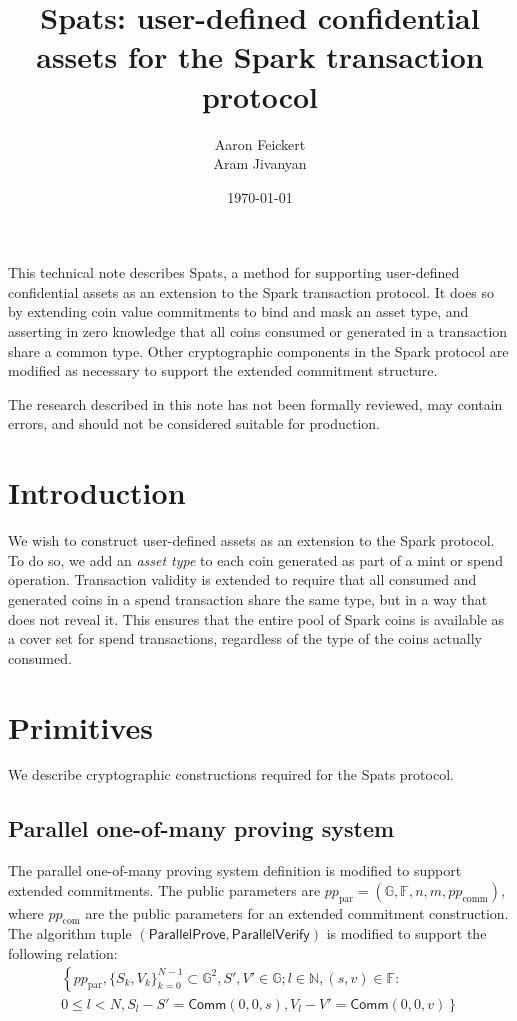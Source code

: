 \documentclass{article}
\title{Spats: user-defined confidential assets for the Spark transaction protocol}
\author{Aaron Feickert \\ Aram Jivanyan}
\date{\today}
\newcommand{\G}{\mathbb{G}}
\newcommand{\F}{\mathbb{F}}
\newcommand{\func}[1]{\mathsf{#1}}
\newcommand{\comm}{\func{Comm}}
\begin{document}
\maketitle

This technical note describes Spats, a method for supporting user-defined confidential assets as an extension to the Spark transaction protocol.
It does so by extending coin value commitments to bind and mask an asset type, and asserting in zero knowledge that all coins consumed or generated in a transaction share a common type.
Other cryptographic components in the Spark protocol are modified as necessary to support the extended commitment structure.

The research described in this note has not been formally reviewed, may contain errors, and should not be considered suitable for production.


\section{Introduction}

We wish to construct user-defined assets as an extension to the Spark protocol.
To do so, we add an \textit{asset type} to each coin generated as part of a mint or spend operation.
Transaction validity is extended to require that all consumed and generated coins in a spend transaction share the same type, but in a way that does not reveal it.
This ensures that the entire pool of Spark coins is available as a cover set for spend transactions, regardless of the type of the coins actually consumed.


\section{Primitives}

We describe cryptographic constructions required for the Spats protocol.


\subsection{Parallel one-of-many proving system}

The parallel one-of-many proving system definition is modified to support extended commitments.
The public parameters are $pp_{\text{par}} = (\G, \F, n, m, pp_{\text{comm}})$, where $pp_{\text{com}}$ are the public parameters for an extended commitment construction.
The algorithm tuple $(\func{ParallelProve}, \func{ParallelVerify})$ is modified to support the following relation:
\begin{multline*}
\left\{ pp_{\text{par}}, \{S_k,V_k\}_{k=0}^{N-1} \subset \G^2, S',V' \in \G ; l \in \mathbb{N}, (s,v) \in \F : \right. \\
\left. 0 \leq l < N, S_l - S' = \comm(0,0,s), V_l - V' = \comm(0,0,v) \right\}
\end{multline*}
\end{document}
